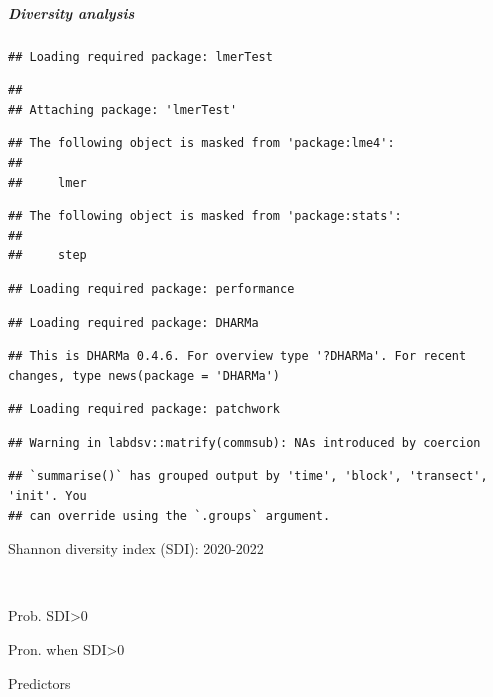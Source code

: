 \documentclass[
]{article}
\begin{document}
\hypertarget{diversity-analysis}{%
\subparagraph{Diversity analysis}\label{diversity-analysis}}

\begin{verbatim}
## Loading required package: lmerTest
\end{verbatim}

\begin{verbatim}
## 
## Attaching package: 'lmerTest'
\end{verbatim}

\begin{verbatim}
## The following object is masked from 'package:lme4':
## 
##     lmer
\end{verbatim}

\begin{verbatim}
## The following object is masked from 'package:stats':
## 
##     step
\end{verbatim}

\begin{verbatim}
## Loading required package: performance
\end{verbatim}

\begin{verbatim}
## Loading required package: DHARMa
\end{verbatim}

\begin{verbatim}
## This is DHARMa 0.4.6. For overview type '?DHARMa'. For recent changes, type news(package = 'DHARMa')
\end{verbatim}

\begin{verbatim}
## Loading required package: patchwork
\end{verbatim}

\begin{verbatim}
## Warning in labdsv::matrify(commsub): NAs introduced by coercion
\end{verbatim}

\begin{verbatim}
## `summarise()` has grouped output by 'time', 'block', 'transect', 'init'. You
## can override using the `.groups` argument.
\end{verbatim}

Shannon diversity index (SDI): 2020-2022

~

Prob. SDI\textgreater0

Pron. when SDI\textgreater0

Predictors
\end{document}
